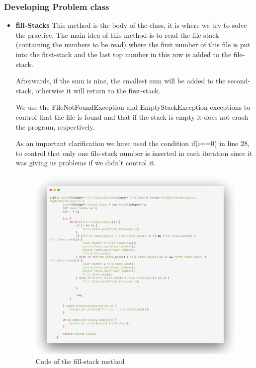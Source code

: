 \documentclass[a4paper]{article}
\theoremstyle{plain}
\theoremstyle{definition}
\begin{document}
        \subsubsection{Developing Problem class}
            \begin{itemize}
                \item \textbf{fill-Stacks}
                This method is the body of the class, it is where we try to solve the practice. The main idea of this method is to read the file-stack (containing the numbers to be read) where the first number of this file is put into the first-stack and the last top number in this row is added to the file-stack.\par

                Afterwards, if the sum is nine, the smallest sum will be added to the second-stack, otherwise it will return to the first-stack.\par

                We use the FileNotFoundException and EmptyStackException exceptions to control that the file is found and that if the stack is empty it does not crash the program, respectively.\par

                As an important clarification we have used the condition if(i==0) in line 28, to control that only one file-stack number is inserted in each iteration since it was giving us problems if we didn't control it.\par
                \begin{figure}[h]
                     \centering
                     \includegraphics[width=300pt\textwidth]{fill-stack.png}
                     \caption{Code of the fill-stack method}
                     \label{fig:mesh1}
                \end{figure}


\end{itemize}
\end{document}
